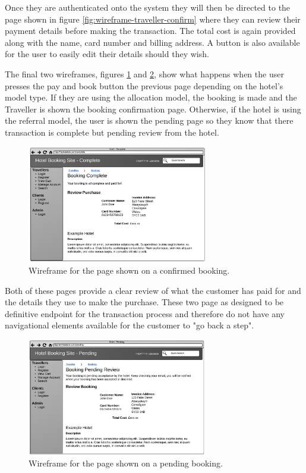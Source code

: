 \documentclass{article}
\begin{document}
Once they are authenticated onto the system they will then be directed to the page shown in figure \ref{fig:wireframe-traveller-confirm} where they can review their payment details before making the transaction. The total cost is again provided along with the name, card number and billing address. A button is also available for the user to easily edit their details should they wish.

The final two wireframes, figures \ref{fig:wireframe-traveller-booked} and \ref{fig:wireframe-traveller-pending}, show what happens when the user presses the pay and book button the previous page depending on the hotel's model type. If they are using the allocation model, the booking is made and the Traveller is shown the booking confirmation page. Otherwise, if the hotel is using the referral model, the user is shown the pending page so they know that there transaction is complete but pending review from the hotel.

\begin{figure}[H]
\centering
\includegraphics[width=0.7\textwidth]{img/wireframes/Booked.png}
\caption{Wireframe for the page shown on a confirmed booking.}
\label{fig:wireframe-traveller-booked}
\end{figure}

Both of these pages provide a clear review of what the customer has paid for and the details they use to make the purchase. These two page as designed to be definitive endpoint for the transaction process and therefore do not have any navigational elements available for the customer to "go back a step".

\begin{figure}[H]
\centering
\includegraphics[width=0.7\textwidth]{img/wireframes/Pending.png}
\caption{Wireframe for the page shown on a pending booking.}
\label{fig:wireframe-traveller-pending}
\end{figure}
\end{document}
